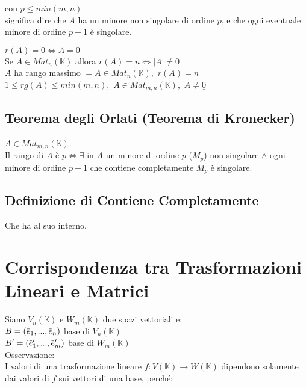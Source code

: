 \documentclass[a4paper, twoside, italian, 11pt]{book}
\newcommand{\detm}[1] {\left | #1 \right |}
\newcommand{\overbar}[1] {\mkern 1.5mu\overline{\mkern-1.5mu#1\mkern-1.5mu}\mkern 1.5mu}
\newcommand{\K}{\mathbb K}
\begin{document}
\noindent
con $p \leq min(m, n)$ \\

\noindent
significa dire che $A$ ha un minore non singolare di ordine $p$, e che ogni eventuale minore di ordine $p + 1$ è singolare.

\noindent
$r(A) = 0 \iff A = \underline{0}$ \\

\noindent
Se $A \in Mat_n(\K)$ allora $r(A) = n \iff \detm A \neq 0$ \\

\noindent
$A$ ha rango massimo $= A \in Mat_n(\K),$ $r(A) = n$ \\

\noindent
$1 \leq rg(A) \leq min(m,n),$ $A \in Mat_{m,n}(\K),$ $A \neq \underline{0}$


\subsection{Teorema degli Orlati (Teorema di Kronecker)}

$A \in Mat_{m,n}(\K)$.\\
Il rango di $A$ è $p \iff \exists$ in $A$ un minore di ordine $p$ ($M_p$) non singolare $\land$ ogni minore di ordine $p + 1$ che contiene completamente $M_p$ è singolare.


\subsection{Definizione di Contiene Completamente}
Che ha al suo interno.



\section{Corrispondenza tra Trasformazioni Lineari e Matrici}

Siano $V_n(\K)$ e $W_m(\K)$ due spazi vettoriali e: \\

$B = (\overbar e_1, ..., \overbar e_n)$ base di $V_n(\K)$ \\
\indent
$B' = (\overbar e'_1, ..., \overbar e'_m)$ base di $W_m(\K)$ \\

\noindent
Osservazione: \\
I valori di una trasformazione lineare $f : V(\K) \rightarrow W(\K)$ dipendono solamente dai valori di $f$ sui vettori di una base, perché: \\
\end{document}
